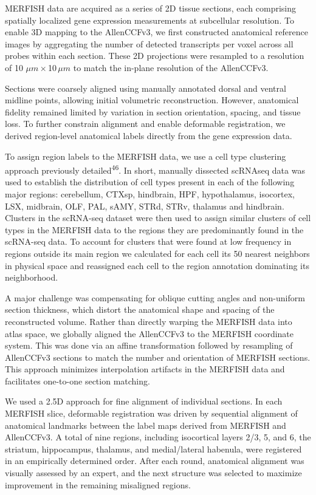 \documentclass[
  12pt,
]{article}
\begin{document}
MERFISH data are acquired as a series of 2D tissue sections, each
comprising spatially localized gene expression measurements at
subcellular resolution. To enable 3D mapping to the AllenCCFv3, we first
constructed anatomical reference images by aggregating the number of
detected transcripts per voxel across all probes within each section.
These 2D projections were resampled to a resolution of 10
\(\mu m\)\,\(\times\)\,10\,\(\mu m\) to match the in-plane resolution of
the AllenCCFv3.

Sections were coarsely aligned using manually annotated dorsal and
ventral midline points, allowing initial volumetric reconstruction.
However, anatomical fidelity remained limited by variation in section
orientation, spacing, and tissue loss. To further constrain alignment
and enable deformable registration, we derived region-level anatomical
labels directly from the gene expression data.

To assign region labels to the MERFISH data, we use a cell type
clustering approach previously detailed\textsuperscript{46}. In short,
manually dissected scRNAseq data was used to establish the distribution
of cell types present in each of the following major regions:
cerebellum, CTXsp, hindbrain, HPF, hypothalamus, isocortex, LSX,
midbrain, OLF, PAL, sAMY, STRd, STRv, thalamus and hindbrain. Clusters
in the scRNA-seq dataset were then used to assign similar clusters of
cell types in the MERFISH data to the regions they are predominantly
found in the scRNA-seq data. To account for clusters that were found at
low frequency in regions outside its main region we calculated for each
cell its 50 nearest neighbors in physical space and reassigned each cell
to the region annotation dominating its neighborhood.

A major challenge was compensating for oblique cutting angles and
non-uniform section thickness, which distort the anatomical shape and
spacing of the reconstructed volume. Rather than directly warping the
MERFISH data into atlas space, we globally aligned the AllenCCFv3 to the
MERFISH coordinate system. This was done via an affine transformation
followed by resampling of AllenCCFv3 sections to match the number and
orientation of MERFISH sections. This approach minimizes interpolation
artifacts in the MERFISH data and facilitates one-to-one section
matching.

We used a 2.5D approach for fine alignment of individual sections. In
each MERFISH slice, deformable registration was driven by sequential
alignment of anatomical landmarks between the label maps derived from
MERFISH and AllenCCFv3. A total of nine regions, including isocortical
layers 2/3, 5, and 6, the striatum, hippocampus, thalamus, and
medial/lateral habenula, were registered in an empirically determined
order. After each round, anatomical alignment was visually assessed by
an expert, and the next structure was selected to maximize improvement
in the remaining misaligned regions.
\end{document}
